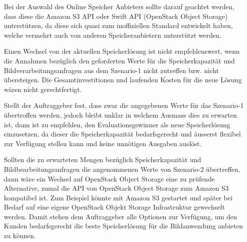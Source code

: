 Bei der Auswahl des Online Speicher Anbieters sollte darauf geachtet werden, dass diese die Amazon S3 API oder Swift API (OpenStack Object Storage) unterstützen, da diese sich quasi zum inoffiziellen Standard entwickelt haben, welche vermehrt auch von anderen Speicheranbietern unterstützt werden.
 
Einen Wechsel von der aktuellen Speicherlösung ist nicht empfehlenswert, wenn die Annahmen bezüglich den geforderten Werte für die Speicherkapazität und Bildverarbeitungsanfragen aus dem Szenario-1 nicht zutreffen bzw. nicht übersteigen. Die Gesamtinvestitionen und laufenden Kosten für die neue Lösung wären nicht gerechtfertigt.

Stellt der Auftraggeber fest, dass zwar die angegebenen Werte für das Szenario-1 übertroffen werden, jedoch bleibt unklar in welchem Ausmass dies zu erwarten ist, dann ist zu empfehlen, den Evaluationsgewinner als neue Speicherlösung einzusetzen, da dieser die Speicherkapazität bedarfsgerecht und äusserst flexibel zur Verfügung stellen kann und keine unnötigen Ausgaben auslöst.

Sollten die zu erwarteten Mengen bezüglich Speicherkapazität und Bildbearbeitungsanfragen die angenommenen Werte von Szenario-2 übertreffen, dann wäre ein Wechsel auf OpenStack Object Storage eine zu prüfende Alternative, zumal die API von OpenStack Object Storage zum Amazon S3 kompatibel ist. Zum Beispiel könnte mit Amazon S3 gestartet und später bei Bedarf auf eine eigene OpenStack Objekt Storage Infrastruktur gewechselt werden. Damit stehen dem Auftraggeber alle Optionen zur Verfügung, um den Kunden bedarfsgerecht die beste Speicherlösung für die Bildanwendung anbieten zu können.

